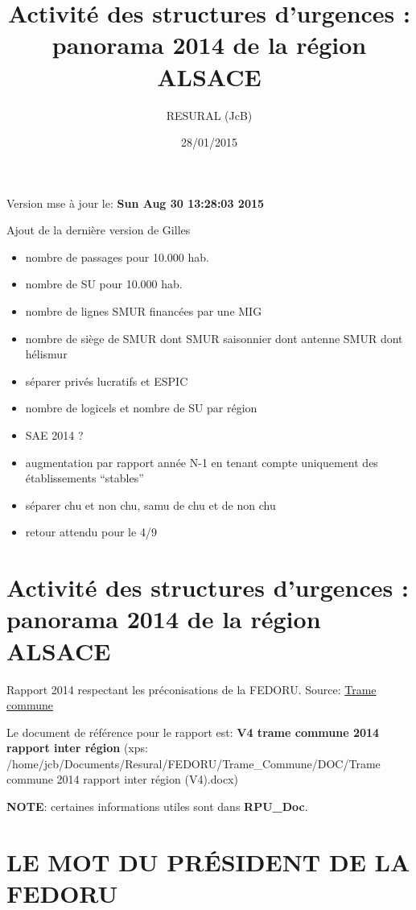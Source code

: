 \documentclass[]{article}
\title{Activité des structures d'urgences : panorama 2014 de la région ALSACE}
\author{RESURAL (JcB)}
\date{28/01/2015}
\begin{document}
\maketitle


{
\hypersetup{linkcolor=black}
\setcounter{tocdepth}{3}
\tableofcontents
}
Version mse à jour le: \textbf{Sun Aug 30 13:28:03 2015}

Ajout de la dernière version de Gilles

\begin{itemize}
\itemsep1pt\parskip0pt
\item
  nombre de passages pour 10.000 hab.
\item
  nombre de SU pour 10.000 hab.
\item
  nombre de lignes SMUR financées par une MIG
\item
  nombre de siège de SMUR dont SMUR saisonnier dont antenne SMUR dont
  hélismur
\item
  séparer privés lucratifs et ESPIC
\item
  nombre de logicels et nombre de SU par région
\item
  SAE 2014 ?
\item
  augmentation par rapport année N-1 en tenant compte uniquement des
  établissements ``stables''
\item
  séparer chu et non chu, samu de chu et de non chu
\item
  retour attendu pour le 4/9
\end{itemize}

\section{Activité des structures d'urgences : panorama 2014 de la région
ALSACE}\label{activite-des-structures-durgences-panorama-2014-de-la-region-alsace}

Rapport 2014 respectant les préconisations de la FEDORU. Source:
\href{https://docs.google.com/document/d/101LYVqVLeHZnrujfMm3aqBYfbOwx3CPEB3Y-Lbud2Ls/edit}{Trame
commune}

Le document de référence pour le rapport est: \textbf{V4 trame commune
2014 rapport inter région} (xps:
/home/jcb/Documents/Resural/FEDORU/Trame\_Commune/DOC/Trame commune 2014
rapport inter région (V4).docx)

\textbf{NOTE}: certaines informations utiles sont dans
\textbf{RPU\_Doc}.

\section{LE MOT DU PRÉSIDENT DE LA
FEDORU}\label{le-mot-du-president-de-la-fedoru}
\end{document}
